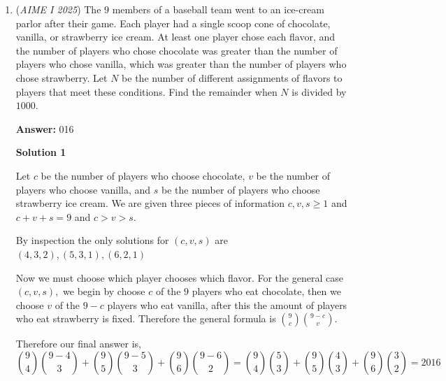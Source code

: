 \begin{enumerate}
$DF = FM$, altitude from $A$ to $DF$ is shared, hence $ADF$ and $AFM$ have the same area.

 $FMEN$ is a trapezoid, $DEFG$ is a trapezoid, $DF=FM$, $EG=EN$, altitude from $D$ or $E$ is shared, so the areas of $FMEN$ and $DEFG$ are the same.

 $NECB$ and $BEGC$ are trapezoids, $NE = EG$, $BC = BC$ and altitude from $E$ or $G$ is shared, hence the areas of $NECB$ and $BEGC$ are the same. 

 Therefore, the area of heptagon $AFNBCEM$ is equal to the area of triangle $ABC$. Note triangle $ADF$ is similar to triangle $ABC$, and if the height of $ADF$ is $h$ and the base is $a$, then we let $EG=b$ so that $2(a+b)h = 288$ and so $6ah = 144$, $ah = 24$. It follows the height of $ABC = 7h$ and the base is $7a$, so $0.5 \cdot 49ah = 0.5 \cdot 49 \cdot 24 = \boxed{588}$ is the area of the heptagon.

 


	\item (\textit{AIME I 2025}) The $9$ members of a baseball team went to an ice-cream parlor after their game. Each player had a single scoop cone of chocolate, vanilla, or strawberry ice cream. At least one player chose each flavor, and the number of players who chose chocolate was greater than the number of players who chose vanilla, which was greater than the number of players who chose strawberry. Let $N$ be the number of different assignments of flavors to players that meet these conditions. Find the remainder when $N$ is divided by $1000.$

 \textbf{Answer: }016



\textbf{Solution 1}

Let $c$ be the number of players who choose chocolate, $v$ be the number of players who choose vanilla, and $s$ be the number of players who choose strawberry ice cream. We are given three pieces of information $c,v,s\ge 1$ and $c+v+s=9$ and $c>v>s$.

 By inspection the only solutions for $(c,v,s)$ are $(4,3,2),(5,3,1), (6, 2, 1)$ 

 Now we must choose which player chooses which flavor. For the general case $(c,v,s),$ we begin by choose $c$ of the $9$ players who eat chocolate, then we choose $v$ of the $9-c$ players who eat vanilla, after this the amount of players who eat strawberry is fixed. Therefore the general formula is $\binom{9}{c}\binom{9-c}{v}.$

 Therefore our final answer is, 
 \[\binom{9}{4}\binom{9-4}{3} + \binom{9}{5}\binom{9-5}{3} + \binom{9}{6}\binom{9-6}{2} = \binom{9}{4}\binom{5}{3} + \binom{9}{5}\binom{4}{3} + \binom{9}{6}\binom{3}{2} = 2\boxed{016}\]


\end{enumerate}
